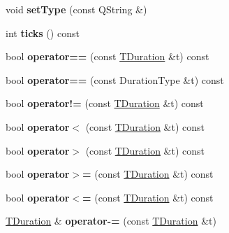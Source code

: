 \begin{DoxyCompactItemize}
void {\bfseries set\+Type} (const Q\+String \&)
\item 
\mbox{\label{class_ms_1_1_t_duration_aa24193408ca221ba7485e071061885bd}} 
int {\bfseries ticks} () const
\item 
\mbox{\label{class_ms_1_1_t_duration_a42a6deb3c433ef2eda071f0f663a6c03}} 
bool {\bfseries operator==} (const \hyperlink{class_ms_1_1_t_duration}{T\+Duration} \&t) const
\item 
\mbox{\label{class_ms_1_1_t_duration_a4ab521f6f2dae74bc04e24f4ed19ced0}} 
bool {\bfseries operator==} (const Duration\+Type \&t) const
\item 
\mbox{\label{class_ms_1_1_t_duration_a42c2abf75916915afe8b0b5cab17b1ab}} 
bool {\bfseries operator!=} (const \hyperlink{class_ms_1_1_t_duration}{T\+Duration} \&t) const
\item 
\mbox{\label{class_ms_1_1_t_duration_ad61113188eeefa91a1ada08bad641216}} 
bool {\bfseries operator$<$} (const \hyperlink{class_ms_1_1_t_duration}{T\+Duration} \&t) const
\item 
\mbox{\label{class_ms_1_1_t_duration_a304cbe8aadc3f7e57ad5760b33ca1ff1}} 
bool {\bfseries operator$>$} (const \hyperlink{class_ms_1_1_t_duration}{T\+Duration} \&t) const
\item 
\mbox{\label{class_ms_1_1_t_duration_a8a3508a81a68750380d5624e9d7e82a1}} 
bool {\bfseries operator$>$=} (const \hyperlink{class_ms_1_1_t_duration}{T\+Duration} \&t) const
\item 
\mbox{\label{class_ms_1_1_t_duration_a271bc4b480cbd27922039f6fc08b79b6}} 
bool {\bfseries operator$<$=} (const \hyperlink{class_ms_1_1_t_duration}{T\+Duration} \&t) const
\item 
\mbox{\label{class_ms_1_1_t_duration_a22bd0ca9a505193e6512b6f2b09e94ac}} 
\hyperlink{class_ms_1_1_t_duration}{T\+Duration} \& {\bfseries operator-\/=} (const \hyperlink{class_ms_1_1_t_duration}{T\+Duration} \&t)
\item 

\end{DoxyCompactItemize}
